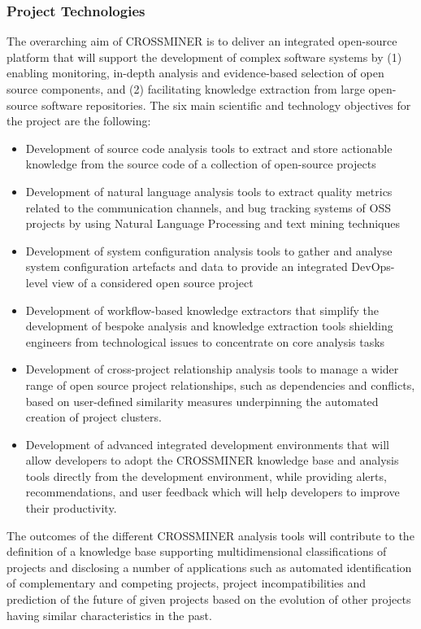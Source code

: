 \subsubsection{Project Technologies}
The overarching aim of CROSSMINER is to deliver an integrated open-source platform that will support the development of complex software systems by (1) enabling monitoring, in-depth analysis and evidence-based selection of open source components, and (2) facilitating knowledge extraction from large open-source software repositories. The six main scientific and technology objectives for the project are the following:
\begin{itemize}
\item Development of source code analysis tools to extract and store actionable knowledge from the source code of a collection of open-source projects

\item Development of natural language analysis tools to extract quality metrics related to the communication channels, and bug tracking systems of OSS projects by using Natural Language Processing and text mining techniques

\item Development of system configuration analysis tools to gather and analyse system configuration artefacts and data to provide an integrated DevOps-level view of a considered open source project

\item Development of workflow-based knowledge extractors that simplify the development of bespoke analysis and knowledge extraction tools shielding engineers from technological issues to concentrate on core analysis tasks

\item Development of cross-project relationship analysis tools to manage a wider range of open source project relationships, such as dependencies and conflicts, based on user-defined similarity measures underpinning the automated creation of project clusters.

\item Development of advanced integrated development environments that will allow developers to adopt the CROSSMINER knowledge base and analysis tools directly from the development environment, while providing alerts, recommendations, and user feedback which will help developers to improve their productivity.
\end{itemize}
The outcomes of the different CROSSMINER analysis tools will contribute to the definition of a knowledge base supporting multidimensional classifications of projects and disclosing a number of applications such as automated identification of complementary and competing projects, project incompatibilities and prediction of the future of given projects based on the evolution of other projects having similar characteristics in the past.

